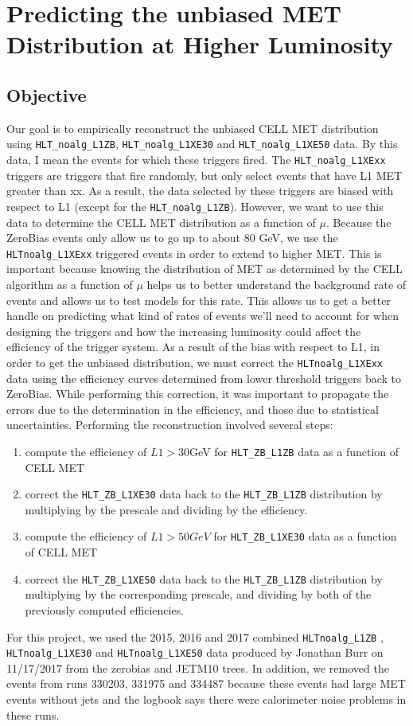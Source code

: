 \chapter{Predicting the unbiased MET Distribution at Higher Luminosity}
\section{Objective}
Our goal is to empirically reconstruct the unbiased CELL MET distribution using \texttt{HLT\_noalg\_L1ZB}, \texttt{HLT\_noalg\_L1XE30} and \texttt{HLT\_noalg\_L1XE50} data. By this data, I mean the events for which these triggers fired. The \texttt{HLT\_noalg\_L1XExx} triggers are triggers that fire randomly, but only select events that have L1 MET greater than xx. 
As a result, the data selected by these triggers are biased with respect to L1 (except for the \texttt{HLT\_noalg\_L1ZB}). 
However, we want to use this data to determine the CELL MET distribution as a function of $\mu$.
Because the ZeroBias events only allow us to go up to about $80$ GeV, we use the \texttt{HLTnoalg\_L1XExx} triggered events in order to extend to higher MET. This is important because knowing the distribution of MET as determined by the CELL algorithm as a function of $\mu$ helps us to better understand the background rate of events and allows us to test models for this rate. This allows us to get a better handle on predicting what kind of rates of events we'll need to account for when designing the triggers and how the increasing luminosity could affect the efficiency of the trigger system.
As a result of the bias with respect to L1, in order to get the unbiased distribution, we must correct the \texttt{HLTnoalg\_L1XExx} data using the efficiency curves determined from lower threshold triggers back to ZeroBias.
While performing this correction, it was important to propagate the errors due to the determination in the efficiency, and those due to statistical uncertainties.
Performing the reconstruction involved several steps:
\begin{enumerate}
        \item compute the efficiency of $L1>30$GeV for \texttt{HLT\_ZB\_L1ZB} data as a function of CELL MET
        \item correct the \texttt{HLT\_ZB\_L1XE30} data back to the \texttt{HLT\_ZB\_L1ZB} distribution by multiplying by the prescale and dividing by the efficiency. 
        \item compute the efficiency of $L1>50GeV$ for \texttt{HLT\_ZB\_L1XE30} data as a function of CELL MET
        \item correct the \texttt{HLT\_ZB\_L1XE50} data back to the \texttt{HLT\_ZB\_L1ZB} distribution by multiplying by the corresponding prescale, and dividing by both of the previously computed efficiencies. 
\end{enumerate}
For this project, we used the 2015, 2016 and 2017 combined \texttt{HLTnoalg\_L1ZB} , \texttt{HLTnoalg\_L1XE30} and \texttt{HLTnoalg\_L1XE50} data produced by Jonathan Burr on 11/17/2017 from the zerobias and JETM10 trees.
In addition, we removed the events from runs 330203, 331975 and 334487 because these events had large MET events without jets and the logbook says there were calorimeter noise problems in these runs. 

